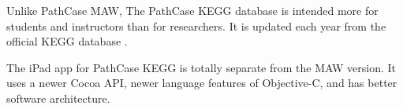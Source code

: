 Unlike PathCase MAW, The PathCase KEGG database is intended more for students
and instructors than for researchers. It is updated each year from the official
KEGG database \cite{pathcase-basic}.

The iPad app for PathCase KEGG is totally separate from the MAW version. It uses
a newer Cocoa API, newer language features of Objective-C, and has better
software architecture.








